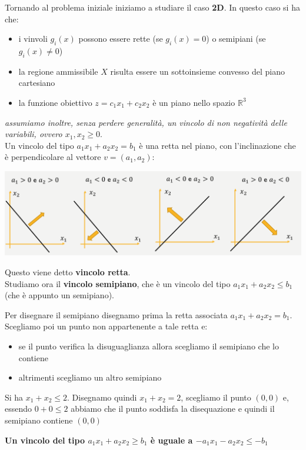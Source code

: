 \documentclass[a4paper,12pt, oneside]{book}
\begin{document}
Tornando al problema iniziale iniziamo a studiare il caso
\textbf{2D}. In questo caso si ha che:
\begin{itemize}
  \item i vinvoli $g_i(x)$ possono essere rette (se $g_i(x)=0$) o
  semipiani (se $g_i(x)\neq 0$)
  \item la regione ammissibile $X$ risulta essere un sottoinsieme
  convesso del piano cartesiano
  \item la funzione obiettivo $z=c_1x_1+c_2x_2$ è un piano nello
  spazio $\mathbb{R}^3$
\end{itemize}
\textit{assumiamo inoltre, senza perdere generalità, un vincolo di
  non negatività delle variabili, ovvero $x_1,x_2\geq 0$}.\\
Un vincolo del tipo $a_1x_1+a_2x_2=b_1$ è una retta nel piano, con
l'inclinazione che è perpendicolare al vettore $v=(a_1,a_2)$:
\begin{center}
  \includegraphics[scale = 0.7]{img/2d.png}
\end{center}
Questo viene detto \textbf{vincolo retta}.\\
Studiamo ora il \textbf{vincolo semipiano}, che è un vincolo del tipo
$a_1x_1+a_2x_2\leq b_1$ (che è appunto un semipiano).
\begin{shaded}
  Per disegnare il semipiano disegnamo prima la retta associata
  $a_1x_1+a_2x_2=b_1$. Scegliamo poi un punto non appartenente a tale
  retta e:
  \begin{itemize}
    \item se il punto verifica la disuguaglianza allora scegliamo il
    semipiano che lo contiene
    \item altrimenti scegliamo un altro semipiano
  \end{itemize}
  \begin{esempio}
    Si ha $x_1+x_2\leq 2$. Disegnamo quindi $x_1+x_2=2$, scegliamo il
    punto $(0,0)$ e, essendo $0+0\leq 2$ abbiamo che il punto soddisfa
    la disequazione e quindi il semipiano contiene $(0,0)$
  \end{esempio}
  \textbf{Un vincolo del tipo $a_1x_1+a_2x_2\geq b_1$ è uguale a
    $-a_1x_1-a_2x_2\leq -b_1$}
\end{shaded}
\end{document}
